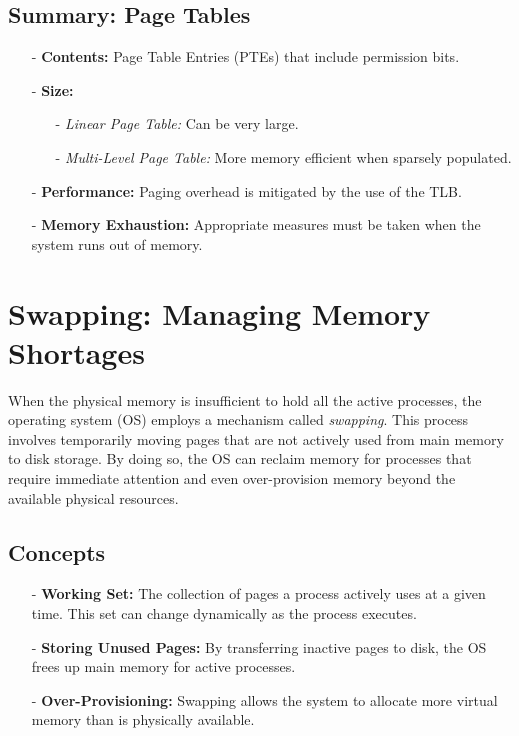 \subsection{Summary: Page Tables}
\begin{itemize}
  \item[-] \textbf{Contents:} Page Table Entries (PTEs) that include permission bits.
  \item[-] \textbf{Size:} 
    \begin{itemize}
      \item[-] \textit{Linear Page Table:} Can be very large.
      \item[-] \textit{Multi-Level Page Table:} More memory efficient when sparsely populated.
    \end{itemize}
  \item[-] \textbf{Performance:} Paging overhead is mitigated by the use of the TLB.
  \item[-] \textbf{Memory Exhaustion:} Appropriate measures must be taken when the system runs out of memory.
\end{itemize}
\section{Swapping: Managing Memory Shortages}
When the physical memory is insufficient to hold all the active processes, the operating system (OS) employs a mechanism called \emph{swapping}. This process involves temporarily moving pages that are not actively used from main memory to disk storage. By doing so, the OS can reclaim memory for processes that require immediate attention and even over-provision memory beyond the available physical resources.

\subsection{Concepts}
\begin{itemize}
  \item[-] \textbf{Working Set:} The collection of pages a process actively uses at a given time. This set can change dynamically as the process executes.
  \item[-] \textbf{Storing Unused Pages:} By transferring inactive pages to disk, the OS frees up main memory for active processes.
  \item[-] \textbf{Over-Provisioning:} Swapping allows the system to allocate more virtual memory than is physically available.
\end{itemize}
\newpage
